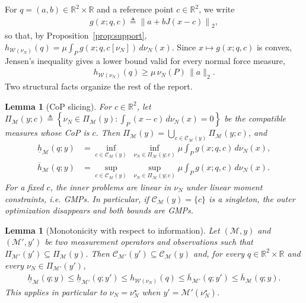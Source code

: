 \documentclass[11pt,a4paper]{article}
\theoremstyle{plain}
\newtheorem{lemma}[theorem]{Lemma}
\newcommand{\R}{\mathbb{R}}
\begin{document}
For $q=(a,b)\in\R^2\times\R$ and a reference point $c\in\R^2$, we write
\begin{align}
    \label{eq:def_g}
    g(x;q,c)\triangleq\left\|a+bJ(x-c)\right\|_2,
\end{align}
so that, by Proposition~\ref{prop:support},
$h_{\mathcal W(\nu_N)}(q)=\mu\int_P g(x;q,c[\nu_N])\,d\nu_N(x)$.
Since $x\mapsto g(x;q,c)$ is convex, Jensen's inequality gives a lower bound valid for every normal force measure,
\begin{align}
    \label{eq:universal_lower}
    h_{\mathcal W(\nu_N)}(q)\ge\mu\,\nu_N(P)\,\|a\|_2.
\end{align}
Two structural facts organize the rest of the report.

\begin{lemma}[CoP slicing]
\label{lem:cop_slicing}
    For $c\in\R^2$, let
    $\Pi_{\mathcal M}(y;c)\triangleq\left\{\nu_N\in\Pi_{\mathcal M}(y):\int_P(x-c)\,d\nu_N(x)=0\right\}$
    be the compatible measures whose CoP is $c$. Then
    $\Pi_{\mathcal M}(y)=\bigcup_{c\in\mathcal C_{\mathcal M}(y)}\Pi_{\mathcal M}(y;c)$, and
    \begin{align}
        \underline h_{\mathcal M}(q;y)
        &=
        \inf_{c\in\mathcal C_{\mathcal M}(y)}
        \;
        \inf_{\nu_N\in\Pi_{\mathcal M}(y;c)}
        \mu\int_P
        g(x;q,c)\,d\nu_N(x),
        \label{eq:parametric_gmp_lower}
        \\
        \overline h_{\mathcal M}(q;y)
        &=
        \sup_{c\in\mathcal C_{\mathcal M}(y)}
        \;
        \sup_{\nu_N\in\Pi_{\mathcal M}(y;c)}
        \mu\int_P
        g(x;q,c)\,d\nu_N(x).
        \label{eq:parametric_gmp_upper}
    \end{align}
    For a fixed $c$, the inner problems are linear in $\nu_N$ under linear moment constraints, i.e. GMPs.
    In particular, if $\mathcal C_{\mathcal M}(y)=\{c\}$ is a singleton, the outer optimization disappears and
    both bounds are GMPs.
\end{lemma}

\begin{lemma}[Monotonicity with respect to information]
\label{lem:monotone}
    Let $(\mathcal M,y)$ and $(\mathcal M',y')$ be two measurement operators and observations such that
    $\Pi_{\mathcal M'}(y')\subseteq\Pi_{\mathcal M}(y)$. Then $\mathcal C_{\mathcal M'}(y')\subseteq\mathcal C_{\mathcal M}(y)$ and,
    for every $q\in\R^2\times\R$ and every $\nu_N\in\Pi_{\mathcal M'}(y')$,
    \begin{align}
        \underline h_{\mathcal M}(q;y)
        \le
        \underline h_{\mathcal M'}(q;y')
        \le
        h_{\mathcal W(\nu_N)}(q)
        \le
        \overline h_{\mathcal M'}(q;y')
        \le
        \overline h_{\mathcal M}(q;y).
    \end{align}
    This applies in particular to $\nu_N=\nu_N^\star$ when $y'=\mathcal M'(\nu_N^\star)$.
\end{lemma}
\end{document}
